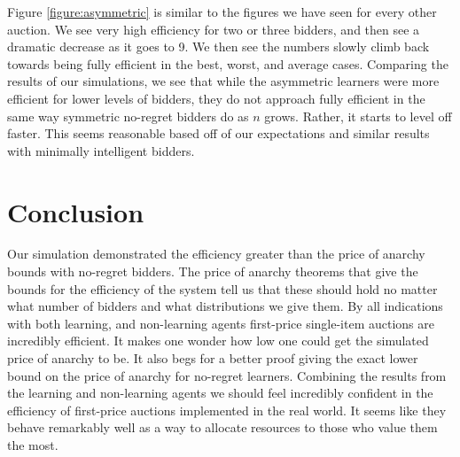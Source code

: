 \documentclass[12pt,twoside]{reedthesis}
\begin{document}
Figure \ref{figure:asymmetric} is similar to the figures we  have seen for every other auction. We see very high efficiency for two or three bidders, and then see a dramatic decrease as it goes to 9. We then see the numbers slowly climb back towards being fully efficient in the best, worst, and average cases. Comparing the results of our simulations, we see that while the asymmetric learners were more efficient for lower levels of bidders, they do not approach fully efficient in the same way symmetric no-regret bidders do as $n$ grows. Rather, it starts to level off faster. This seems reasonable based off of our expectations and similar results with minimally intelligent bidders.

\chapter*{Conclusion}
	\setcounter{chapter}{4}
	\setcounter{section}{0}
	
Our simulation demonstrated the efficiency greater than the price of anarchy bounds with no-regret bidders. The price of anarchy theorems that give the bounds for the efficiency of the system tell us that these should hold no matter what number of bidders and what distributions we give them. By all indications with both learning, and non-learning agents first-price single-item auctions are incredibly efficient. It makes one wonder how low one could get the simulated price of anarchy to be. It also begs for a better proof giving the exact lower bound on the price of anarchy for no-regret learners. Combining the results from the learning and non-learning agents we should feel incredibly confident in the efficiency of first-price auctions implemented in the real world. It seems like they behave remarkably well as a way to allocate resources to those who value them the most. 
\end{document}

